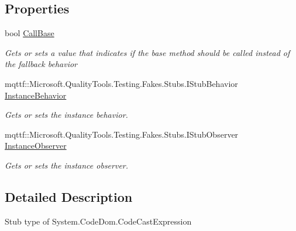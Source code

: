 \subsection*{Properties}
\begin{DoxyCompactItemize}
\item 
bool \hyperlink{class_system_1_1_code_dom_1_1_fakes_1_1_stub_code_cast_expression_a7e1a7dcc0e8053966c8dd52b6f445316}{Call\-Base}
\begin{DoxyCompactList}\small\item\em Gets or sets a value that indicates if the base method should be called instead of the fallback behavior\end{DoxyCompactList}\item 
mqttf\-::\-Microsoft.\-Quality\-Tools.\-Testing.\-Fakes.\-Stubs.\-I\-Stub\-Behavior \hyperlink{class_system_1_1_code_dom_1_1_fakes_1_1_stub_code_cast_expression_ad889d5b3bf493513788efe7c7381ad18}{Instance\-Behavior}
\begin{DoxyCompactList}\small\item\em Gets or sets the instance behavior.\end{DoxyCompactList}\item 
mqttf\-::\-Microsoft.\-Quality\-Tools.\-Testing.\-Fakes.\-Stubs.\-I\-Stub\-Observer \hyperlink{class_system_1_1_code_dom_1_1_fakes_1_1_stub_code_cast_expression_a4647bf6f7094251ce9824e70ee0d1b13}{Instance\-Observer}
\begin{DoxyCompactList}\small\item\em Gets or sets the instance observer.\end{DoxyCompactList}\end{DoxyCompactItemize}


\subsection{Detailed Description}
Stub type of System.\-Code\-Dom.\-Code\-Cast\-Expression




